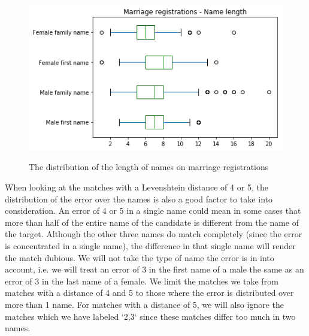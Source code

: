 \begin{figure}[ht]
	\begin{center}
		\caption[Distribution of the length of names]{The distribution of the length of names on marriage registrations}
		\includegraphics[scale=0.6]{figures/avg_name_length_boxplot.png}
		\label{fig:4.1}
	\end{center}
	
\end{figure}

When looking at the matches with a Levenshtein distance of 4 or 5, the distribution of the error over the names is also a good factor to take into consideration. An error of 4 or 5 in a single name could mean in some cases that more than half of the entire name of the candidate is different from the name of the target. Although the other three names do match completely (since the error is concentrated in a single name), the difference in that single name will render the match dubious. We will not take the type of name the error is in into account, i.e. we will treat an error of 3 in the first name of a male the same as an error of 3 in the last name of a female.  
We limit the matches we take from matches with a distance of 4 and 5 to those where the error is distributed over more than 1 name. For matches with a distance of 5, we will also ignore the matches which we have labeled `2,3` since these matches differ too much in two names. 

